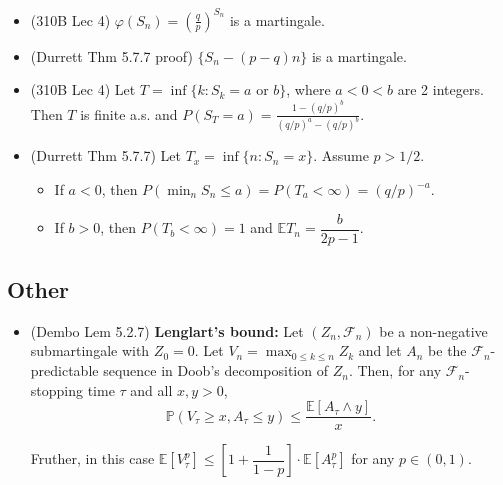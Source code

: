 \documentclass[twoside]{article}
\newcommand{\dis}{\displaystyle}
\newcommand\bbE{\mathbb{E}}
\newcommand\bbP{\mathbb{P}}
\newcommand\calF{\mathcal{F}}
\begin{document}
\begin{itemize}
\item (310B Lec 4) $\varphi(S_n) = \left( \dis\frac{q}{p} \right)^{S_n}$ is a martingale.

\item (Durrett Thm 5.7.7 proof) $\{ S_n - (p-q)n \}$ is a martingale.

\item (310B Lec 4) Let $T = \inf \{ k: S_k = a \text{ or } b\}$, where $a < 0 < b$ are 2 integers. Then $T$ is finite a.s. and $P(S_T = a) = \dis\frac{1 - (q/p)^b}{(q/p)^a - (q/p)^b}$.

\item (Durrett Thm 5.7.7) Let $T_x = \inf \{ n: S_n = x\}$. Assume $p > 1/2$. 
\begin{itemize}
\item If $a < 0$, then $P\left(\dis\min_n S_n \leq a \right) = P(T_a < \infty) = (q/p)^{-a}$.

\item If $b > 0$, then $P(T_b < \infty) = 1$ and $\bbE T_n = \dfrac{b}{2p-1}$.
\end{itemize}

\end{itemize}

\subsection*{Other}
\begin{itemize}
\item (Dembo Lem 5.2.7) \textbf{Lenglart's bound:} Let $(Z_n, \calF_n)$ be a non-negative submartingale with $Z_0 = 0$. Let $V_n = \dis\max_{0 \leq k \leq n} Z_k$ and let $A_n$ be the $\calF_n$-predictable sequence in Doob's decomposition of $Z_n$. Then, for any $\calF_n$-stopping time $\tau$ and all $x, y > 0$,
\[ \bbP(V_\tau \geq x, A_\tau \leq y) \leq \frac{\bbE [A_\tau \wedge y]}{x}. \]

Fruther, in this case $\bbE [V_\tau^p] \leq \left[1 + \dfrac{1}{1-p} \right] \cdot \bbE [A_\tau^p]$ for any $p \in (0,1)$.

\end{itemize}
\end{document}
